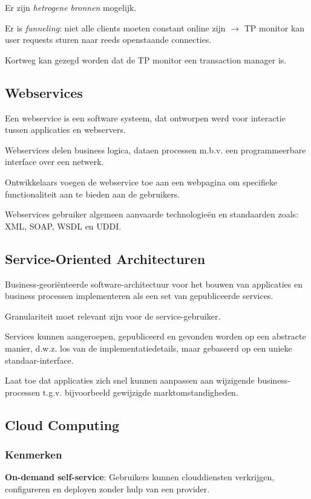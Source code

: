 \documentclass[a4paper,12pt]{article}
\begin{document}
Er zijn \textit{hetrogene bronnen} mogelijk.

Er is \textit{funneling}: niet alle clients moeten constant online zijn
$\rightarrow$ TP monitor kan user requests sturen naar reeds openstaande connecties.

Kortweg kan gezegd worden dat de TP monitor een transaction manager is.

\subsection{Webservices}
Een webservice is een software systeem, dat ontworpen werd voor interactie tussen applicaties en webservers.

Webservices delen business logica, dataen processen m.b.v. een programmeerbare interface over een netwerk.

Ontwikkelaars voegen de webservice toe aan een webpagina om specifieke functionaliteit aan te bieden aan de gebruikers.

Webservices gebruiker algemeen aanvaarde technologieën en standaarden zoals: XML, SOAP, WSDL en UDDI.

\subsection{Service-Oriented Architecturen}
Business-georiënteerde software-architectuur voor het bouwen van applicaties en business processen implementeren als een set van gepubliceerde services.

Granulariteit moet relevant zijn voor de service-gebruiker.

Services kunnen aangeroepen, gepubliceerd en gevonden worden op een abstracte manier, d.w.z. los van de implementatiedetails, maar gebaseerd op een unieke standaar-interface.

Laat toe dat applicaties zich snel kunnen aanpassen aan wijzigende business-processen t.g.v. bijvoorbeeld gewijzigde marktomstandigheden.

\subsection{Cloud Computing}
\subsubsection{Kenmerken}
\textbf{On-demand self-service}: Gebruikers kunnen clouddiensten verkrijgen, configureren en deployen zonder hulp van een provider.
\end{document}
